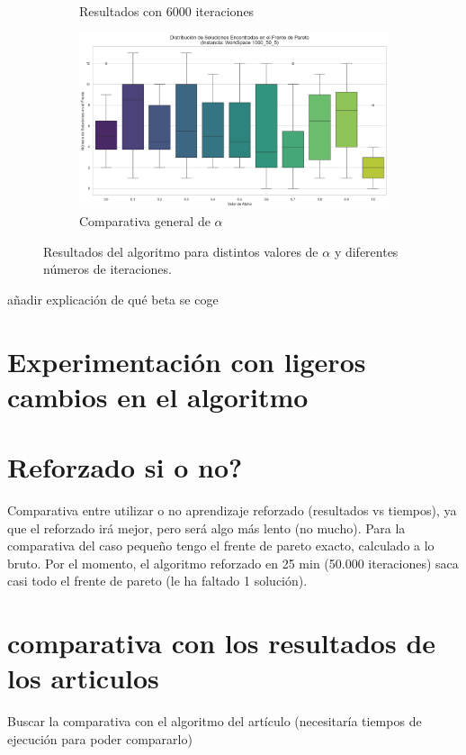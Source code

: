 \documentclass[12pt,a4paper]{book}
\begin{document}
\begin{figure}[H]
\begin{subfigure}{0.45\textwidth}
        \caption{Resultados con 6000 iteraciones}
        \label{fig:beta_6000}
    \end{subfigure}
    \hfill
    \begin{subfigure}{0.45\textwidth}
        \centering
        \includegraphics[width=\linewidth]{images_finetuning/alphas}
        \caption{Comparativa general de $\alpha$}
        \label{fig:betas}
    \end{subfigure}
    \caption{Resultados del algoritmo para distintos valores de $\alpha$ y diferentes números de iteraciones.}
    \label{fig:resultados_beta}
\end{figure}

\color{red} añadir explicación de qué beta se coge \color{black}

\section{Experimentación con ligeros cambios en el algoritmo}

\section{Reforzado si o no?}
Comparativa entre utilizar o no aprendizaje reforzado (resultados vs tiempos), ya que el reforzado irá mejor, pero será algo más lento (no mucho).
Para la comparativa del caso pequeño tengo el frente de pareto exacto, calculado a lo bruto. Por el momento, el algoritmo reforzado en 25 min (50.000 iteraciones) saca casi todo el frente de pareto (le ha faltado 1 solución).

\section{comparativa con los resultados de los articulos}
Buscar la comparativa con el algoritmo del artículo (necesitaría tiempos de ejecución para poder compararlo)
\end{document}

